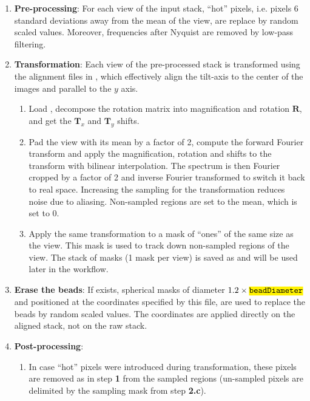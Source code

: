 \begin{enumerate}
    \item \textbf{Pre-processing}: For each view of the input stack, ``hot'' pixels, i.e. pixels 6 standard deviations away from the mean of the view, are replace by random scaled values. Moreover, frequencies after Nyquist are removed by low-pass filtering.

    \item \textbf{Transformation}: Each view of the pre-processed stack is transformed using the alignment files in , which effectively align the tilt-axis to the center of the images and parallel to the $y$ axis.
    \begin{enumerate}
        \item Load , decompose the rotation matrix into magnification and rotation $\bm{R}$, and get the $\bm{T}_x$ and $\bm{T}_y$ shifts.
        \item Pad the view with its mean by a factor of 2, compute the forward Fourier transform and apply the magnification, rotation and shifts to the transform with bilinear interpolation. The spectrum is then Fourier cropped by a factor of 2 and inverse Fourier transformed to switch it back to real space. Increasing the sampling for the transformation reduces noise due to aliasing. Non-sampled regions are set to the mean, which is set to 0.
        
        \item Apply the same transformation to a mask of ``ones'' of the same size as the view. This mask is used to track down non-sampled regions of the view. The stack of masks (1 mask per view) is saved as  and will be used later in the workflow.
    \end{enumerate}
    
    \item \textbf{Erase the beads}: If  exists, spherical masks of diameter $1.2\times\code{beadDiameter}$ and positioned at the coordinates specified by this file, are used to replace the beads by random scaled values. The coordinates are applied directly on the aligned stack, not on the raw stack.

    \item \textbf{Post-processing}:
    \begin{enumerate}
        \item In case ``hot'' pixels were introduced during transformation, these pixels are removed as in step \textbf{1} from the sampled regions (un-sampled pixels are delimited by the sampling mask from step \textbf{2.c}).


\end{enumerate}
\end{enumerate}
